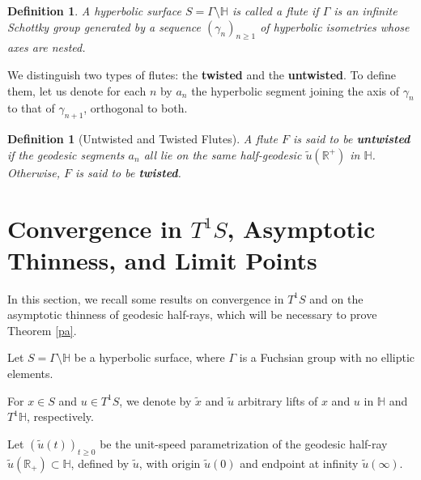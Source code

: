 \documentclass[11pt]{amsart}
\newtheorem{dfn}[thm]{Definition}
\begin{document}
\begin{dfn}
A hyperbolic surface \( S = \Gamma \setminus \mathbb{H} \) is called a \emph{flute} if \( \Gamma \) is an infinite Schottky group generated by a sequence \( (\gamma_n)_{n \geq 1} \) of hyperbolic isometries whose axes are nested.
\end{dfn}

We distinguish two types of flutes: the \textbf{twisted} and the \textbf{untwisted}. To define them, let us denote for each \( n \) by \( a_n \) the hyperbolic segment joining the axis of \( \gamma_n \) to that of \( \gamma_{n+1} \), orthogonal to both.
\begin{dfn}[Untwisted and Twisted Flutes]
A flute \( F \) is said to be \textbf{untwisted} if the geodesic segments \( a_n \) all lie on the same half-geodesic \( \tilde{u}(\mathbb{R}^+) \) in \( \mathbb{H} \). Otherwise, \( F \) is said to be \textbf{twisted}.
\end{dfn}







\section{Convergence in $T^{1}S$, Asymptotic Thinness, and Limit Points}

In this section, we recall some results on convergence in $ T^{1}S$ and on the asymptotic thinness of geodesic half-rays, which will be necessary to prove Theorem \ref{pa}.

Let $S=\Gamma\setminus\mathbb{H}$ be a hyperbolic surface, where $\Gamma$ is a Fuchsian group with no elliptic elements.

For $x \in S$ and  $u \in T^1S$, we denote by $\widetilde{x}$ and $\widetilde{u}$ arbitrary lifts of $x$ and $u$ in $\mathbb{H}$ and $T^1\mathbb{H}$, respectively.

Let \( (\widetilde{u}(t))_{t \geq 0} \) be the unit-speed parametrization of the geodesic half-ray \( \widetilde{u}(\mathbb{R}_{+}) \subset \mathbb{H} \), defined by \( \widetilde{u} \), with origin \( \widetilde{u}(0) \) and endpoint at infinity \( \widetilde{u}(\infty) \).
\end{document}
